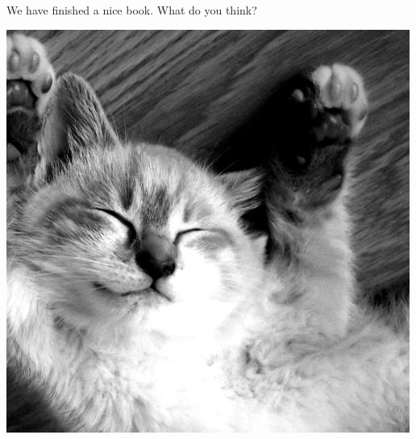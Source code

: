\documentclass[
]{book}
\begin{document}
We have finished a nice book. What do you think?

\includegraphics{images/500.jpg}
\end{document}

